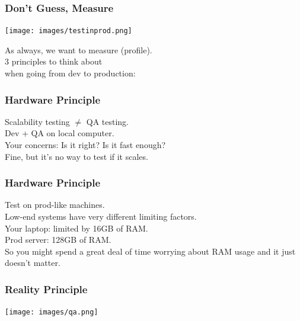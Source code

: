 \begin{frame}
\frametitle{Don't Guess, Measure}


\begin{center}
	\texttt{[image: images/testinprod.png]}
\end{center}


As always, we want to measure (profile).\\[1em]
3 principles to think about\\
when going from dev to production:




\end{frame}



\begin{frame}
\frametitle{Hardware Principle}


\begin{changemargin}{2cm}
Scalability testing $\neq$  QA testing.\\[1em]

Dev + QA on local computer.\\
Your concerns: Is it right? Is it fast enough?\\[1em]

Fine, but it's no way to test if it scales. 
\end{changemargin}

\end{frame}



\begin{frame}
\frametitle{Hardware Principle}


\begin{changemargin}{2cm}
Test on prod-like machines.\\[1em]
Low-end systems have very different limiting factors. \\[1em]
Your laptop: limited by 16GB of RAM.\\
Prod server: 128GB of RAM.\\[1em]
So you might spend a great deal of time worrying about RAM usage and it just doesn't matter.
\end{changemargin}

\end{frame}



\begin{frame}
\frametitle{Reality Principle}

\begin{center}
	\texttt{[image: images/qa.png]}
\end{center}


\end{frame}


